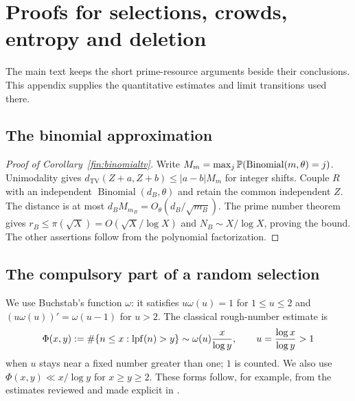 \section{Proofs for selections, crowds, entropy and deletion}\label{finapp:all}
The main text keeps the short prime-resource arguments beside their
conclusions.  This appendix supplies the quantitative estimates and
limit transitions used there.

\subsection{The binomial approximation}\label{finapp:binomial}
\begin{proof}[Proof of Corollary~\ref{fin:binomialtv}]
Write $M_m=\max_j\mathbb P(\operatorname{Binomial}(m,\theta)=j)$.
Unimodality gives
$d_{\mathrm{TV}}(Z+a,Z+b)\le |a-b|M_m$ for integer shifts.
Couple $R$ with an independent $\operatorname{Binomial}(d_B,\theta)$
and retain the common independent $Z$.  The distance is at most
$d_B M_{m_B}=O_\theta(d_B/\sqrt{m_B})$.
The prime number theorem gives
$r_B\le\pi(\sqrt X)=O(\sqrt X/\log X)$ and
$N_B\sim X/\log X$, proving the bound.  The other assertions follow
from the polynomial factorization.
\end{proof}

\subsection{The compulsory part of a random selection}\label{finapp:greedy}
We use Buchstab's function $\omega$: it satisfies $u\omega(u)=1$ for
$1\le u\le2$ and $(u\omega(u))'=\omega(u-1)$ for $u>2$.
The classical rough-number estimate is
\begin{equation}
 \Phi(x,y):=\#\{n\le x:\operatorname{lpf}(n)>y\}
 \sim \omega(u)\frac{x}{\log y},\qquad
 u=\frac{\log x}{\log y}>1
 \label{fin:rough}
\end{equation}
when $u$ stays near a fixed number greater than one; $1$ is counted.
We also use $\Phi(x,y)\ll x/\log y$ for $x\ge y\ge2$.
These forms follow, for example, from the estimates reviewed and made
explicit in \cite{finFanRough}.

